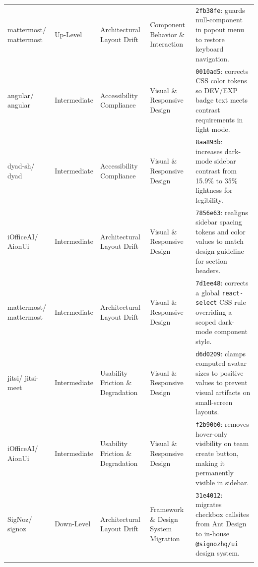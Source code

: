 \documentclass{article}
\begin{document}
\begin{table}[H]
{\begin{tabularx}{\textwidth}{p{1.8cm} p{1.5cm} p{2.3cm} p{2.3cm} X}
mattermost/ mattermost & Up-Level & Architectural Layout Drift & Component Behavior \& Interaction & \texttt{2fb38fe}: guards null-component in popout menu to restore keyboard navigation. \cite{commit:mattermost:menu} \\
\addlinespace

angular/ angular & Intermediate & Accessibility Compliance & Visual \& Responsive Design & \texttt{0010ad5}: corrects CSS color tokens so DEV/EXP badge text meets contrast requirements in light mode. \cite{commit:angular:contrast} \\
\addlinespace

dyad-sh/ dyad & Intermediate & Accessibility Compliance & Visual \& Responsive Design & \texttt{8aa893b}: increases dark-mode sidebar contrast from 15.9\% to 35\% lightness for legibility. \cite{commit:dyad:hover} \\
\addlinespace

iOfficeAI/ AionUi & Intermediate & Architectural Layout Drift & Visual \& Responsive Design & \texttt{7856e63}: realigns sidebar spacing tokens and color values to match design guideline for section headers. \cite{commit:aionui:sider} \\
\addlinespace

mattermost/ mattermost & Intermediate & Architectural Layout Drift & Visual \& Responsive Design & \texttt{7d1ee48}: corrects a global \texttt{react-select} CSS rule overriding a scoped dark-mode component style. \cite{commit:mattermost:darkmode} \\
\addlinespace

jitsi/ jitsi-meet & Intermediate & Usability Friction \& Degradation & Visual \& Responsive Design & \texttt{d6d0209}: clamps computed avatar sizes to positive values to prevent visual artifacts on small-screen layouts. \cite{commit:jitsi:avatar} \\
\addlinespace

iOfficeAI/ AionUi & Intermediate & Usability Friction \& Degradation & Visual \& Responsive Design & \texttt{f2b90b0}: removes hover-only visibility on team create button, making it permanently visible in sidebar. \cite{commit:aionui:button} \\
\addlinespace

SigNoz/ signoz & Down-Level & Architectural Layout Drift & Framework \& Design System Migration & \texttt{31e4012}: migrates checkbox callsites from Ant Design to in-house \texttt{@signozhq/ui} design system. \cite{commit:signoz:checkbox} \\
\addlinespace


\end{tabularx}}
\end{table}
\end{document}
